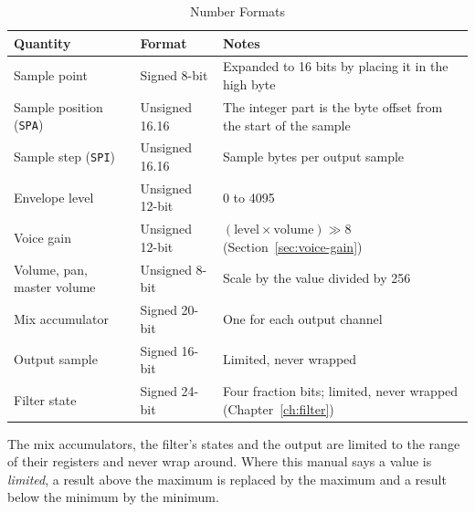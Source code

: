 \begin{table}[H]
	\centering
	\begin{tabular}{llp{7.2cm}}
		\toprule
		\textbf{Quantity}              & \textbf{Format} & \textbf{Notes}                                                                 \\
		\midrule
		Sample point                   & Signed 8-bit    & Expanded to 16 bits by placing it in the high byte                             \\
		Sample position (\texttt{SPA}) & Unsigned 16.16  & The integer part is the byte offset from the start of the sample               \\
		Sample step (\texttt{SPI})     & Unsigned 16.16  & Sample bytes per output sample                                                 \\
		Envelope level                 & Unsigned 12-bit & 0 to 4095                                                                      \\
		Voice gain                     & Unsigned 12-bit & $(\mathrm{level} \times \mathrm{volume}) \gg 8$ (Section~\ref{sec:voice-gain}) \\
		Volume, pan, master volume     & Unsigned 8-bit  & Scale by the value divided by 256                                              \\
		Mix accumulator                & Signed 20-bit   & One for each output channel                                                    \\
		Output sample                  & Signed 16-bit   & Limited, never wrapped                                                         \\
		Filter state                   & Signed 24-bit   & Four fraction bits; limited, never wrapped (Chapter~\ref{ch:filter})           \\
		\bottomrule
	\end{tabular}
	\caption{Number Formats}
	\label{tab:number-formats}
\end{table}

The mix accumulators, the filter's states and the output are limited to the range of their registers and never wrap
around. Where this manual says a value is \emph{limited}, a result above the maximum is replaced by the maximum and a
result below the minimum by the minimum.
